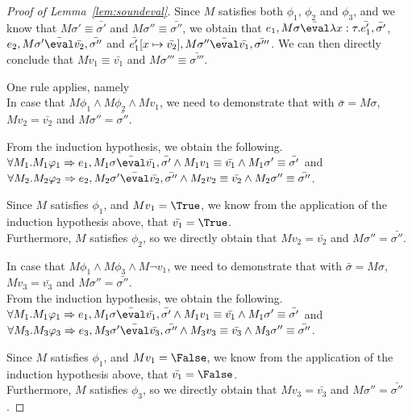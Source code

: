 \begin{proof}[Proof of Lemma~\ref{lem:soundeval}]
{  Since $M$ satisfies both $\phi_1$, $\phi_2$ and $\phi_3$, and we know that
  $M\sigma' \equiv\bar{\sigma'}$ and $M\sigma'' \equiv\bar{\sigma''}$,
  we obtain that $e_1,M\sigma \bar{\eval}\lambda x : \tau.\bar{e_1'},\bar{\sigma'}$, $e_2,M\sigma' \bar{\eval}\bar{v_2},\bar{\sigma''}$ and $\bar{e_1'}[x\mapsto \bar{v_2}],M\sigma'' \bar{\eval}\bar{v_1},\bar{\sigma'''}$.
  We can then directly conclude that $M v_1 \equiv \bar{v_1}$ and $M\sigma'''\equiv\bar{\sigma'''}$.
  }

   {One rule applies, namely \\

   In case that $M\phi_1\land M\phi_2 \land Mv_1$,
   we need to demonstrate that
    with $\bar{\sigma}=M\sigma$,
   $M v_2 = \bar{v_2}$ and $M\sigma''=\bar{\sigma''}$.

   From the induction hypothesis, we obtain the following.\\
   $\forall M_1 . M_1\phi_1 \implies e_1,M_1\sigma\bar{\eval}\bar{v_1},\bar{\sigma'}
   \land M_1v_1 \equiv \bar{v_1} \land M_1\sigma'\equiv\bar{\sigma'}$
   and\\
   $\forall M_2 . M_2\phi_2 \implies e_2,M_2\sigma'\bar{\eval}\bar{v_2},\bar{\sigma''}
   \land M_2 v_2 \equiv \bar{v_2} \land M_2\sigma'' \equiv\bar{\sigma''}$.

   Since $M$ satisfies $\phi_1$, and $M v_1=\True$, we know from the application of the induction hypothesis above, that $\bar{v_1}=\True$.\\
   Furthermore, $M$ satisfies $\phi_2$, so we directly obtain that $Mv_2=\bar{v_2}$ and $M\sigma''=\bar{\sigma''}$.

   In case that $M\phi_1\land M\phi_3 \land M\neg v_1$,
   we need to demonstrate that
    with $\bar{\sigma}=M\sigma$,
   $M v_3 = \bar{v_3}$ and $M\sigma''=\bar{\sigma''}$.\\

   From the induction hypothesis, we obtain the following.\\
   $\forall M_1 . M_1\phi_1 \implies e_1,M_1\sigma\bar{\eval}\bar{v_1},\bar{\sigma'}
   \land M_1v_1 \equiv \bar{v_1} \land M_1\sigma'\equiv\bar{\sigma'}$
   and\\
   $\forall M_3 . M_3\phi_3 \implies e_3,M_3\sigma'\bar{\eval}\bar{v_3},\bar{\sigma''}
   \land M_3 v_3 \equiv \bar{v_3} \land M_3\sigma'' \equiv\bar{\sigma''}$.

   Since $M$ satisfies $\phi_1$, and $M v_1=\False$, we know from the application of the induction hypothesis above, that $\bar{v_1}=\False$.\\
   Furthermore, $M$ satisfies $\phi_3$, so we directly obtain that $Mv_3=\bar{v_3}$ and $M\sigma''=\bar{\sigma''}$.
  }


\end{proof}
